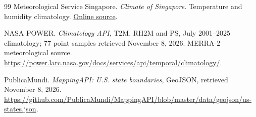 \begin{thebibliography}{99}
Meteorological Service Singapore. \emph{Climate of Singapore}. Temperature and humidity climatology.
\href{https://www.weather.gov.sg/climate-climate-of-singapore}{Online source}. 


NASA POWER. \emph{Climatology API}, T2M, RH2M and PS, July 2001--2025 climatology; 77 point samples retrieved November 8, 2026. MERRA-2 meteorological source.
\url{https://power.larc.nasa.gov/docs/services/api/temporal/climatology/}.

PublicaMundi. \emph{MappingAPI: U.S. state boundaries}, GeoJSON, retrieved November 8, 2026.
\url{https://github.com/PublicaMundi/MappingAPI/blob/master/data/geojson/us-states.json}.
\end{thebibliography}